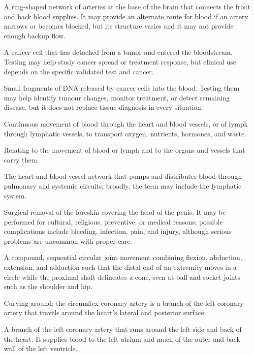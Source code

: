  A ring-shaped network of arteries at the base of the brain that connects the front and back blood supplies. It may provide an alternate route for blood if an artery narrows or becomes blocked, but its structure varies and it may not provide enough backup flow.

 A cancer cell that has detached from a tumor and entered the bloodstream. Testing may help study cancer spread or treatment response, but clinical use depends on the specific validated test and cancer.

 Small fragments of DNA released by cancer cells into the blood. Testing them may help identify tumour changes, monitor treatment, or detect remaining disease, but it does not replace tissue diagnosis in every situation.

 Continuous movement of blood through the heart and blood vessels, or of lymph through lymphatic vessels, to transport oxygen, nutrients, hormones, and waste.

 Relating to the movement of blood or lymph and to the organs and vessels that carry them.

 The heart and blood-vessel network that pumps and distributes blood through pulmonary and systemic circuits; broadly, the term may include the lymphatic system.

 Surgical removal of the foreskin covering the head of the penis. It may be performed for cultural, religious, preventive, or medical reasons; possible complications include bleeding, infection, pain, and injury, although serious problems are uncommon with proper care.

 A compound, sequential circular joint movement combining flexion, abduction, extension, and adduction such that the distal end of an extremity moves in a circle while the proximal shaft delineates a cone, seen at ball-and-socket joints such as the shoulder and hip.

 Curving around; the circumflex coronary artery is a branch of the left coronary artery that travels around the heart's lateral and posterior surface.

 A branch of the left coronary artery that runs around the left side and back of the heart. It supplies blood to the left atrium and much of the outer and back wall of the left ventricle.

